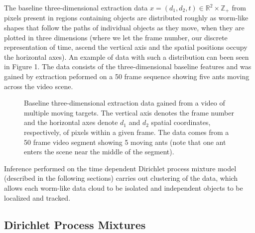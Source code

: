 \documentclass{article}
\begin{document}
The baseline three-dimensional extraction data $x = ( d_{1}, d_{2}, t ) \in \mathbb{R}^{2} \times \mathbb{Z}_{+}$ from pixels present in regions containing objects are distributed roughly as worm-like shapes that follow the paths of individual objects as they move, when they are plotted in three dimensions (where we let the frame number, our discrete representation of time, ascend the vertical axis and the spatial positions occupy the horizontal axes). An example of data with such a distribution can been seen in Figure 1. The data consists of the three-dimensional baseline features and was gained by extraction peformed on a 50 frame sequence showing five ants moving across the video scene.
\begin{figure}[h]
        \caption{\label{Figure 1:} Baseline three-dimensional extraction data gained from a video of multiple moving targets. The vertical axis denotes the frame number and the horizontal axes denote $d_{1}$ and $d_{2}$ spatial coordinates, respectively, of pixels within a given frame. The data comes from a 50 frame video segment showing 5 moving ants (note that one ant enters the scene near the middle of the segment).}
\end{figure}
Inference performed on the time dependent Dirichlet process mixture model (described in the following sections) carries out clustering of the data, which allows each worm-like data cloud to be isolated and independent objects to be localized and tracked.






\subsection{Dirichlet Process Mixtures}
\end{document}

